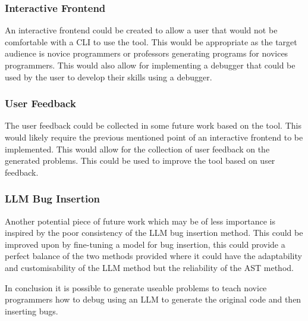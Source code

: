 \documentclass[12pt]{extarticle}
\begin{document}
\subsubsection{Interactive Frontend}

An interactive frontend could be created to allow a user that would not be comfortable with a CLI to use the tool. This would be appropriate as the target audience is novice programmers or professors generating programs for novices programmers. This would also allow for implementing a debugger that could be used by the user to develop their skills using a debugger.

\subsubsection{User Feedback}

The user feedback could be collected in some future work based on the tool. This would likely require the previous mentioned point of an interactive frontend to be implemented. This would allow for the collection of user feedback on the generated problems. This could be used to improve the tool based on user feedback.

\subsubsection{LLM Bug Insertion}

Another potential piece of future work which may be of less importance is inspired by the poor consistency of the LLM bug insertion method. This could be improved upon by fine-tuning a model for bug insertion, this could provide a perfect balance of the two methods provided where it could have the adaptability and customisability of the LLM method but the reliability of the AST method.

In conclusion it is possible to generate useable problems to teach novice programmers how to debug using an LLM to generate the original code and then inserting bugs.
\end{document}
